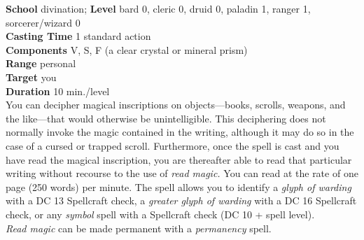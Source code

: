 \textbf{School} divination; \textbf{Level} bard 0, cleric 0, druid 0, paladin 1, ranger 1, sorcerer/wizard 0\\
\textbf{Casting Time} 1 standard action\\
\textbf{Components} V, S, F (a clear crystal or mineral prism)\\
\textbf{Range} personal\\
\textbf{Target} you\\
\textbf{Duration} 10 min./level\\
You can decipher magical inscriptions on objects---books, scrolls, weapons, and the like---that would otherwise be unintelligible. This deciphering does not normally invoke the magic contained in the writing, although it may do so in the case of a cursed or trapped scroll. Furthermore, once the spell is cast and you have read the magical inscription, you are thereafter able to read that particular writing without recourse to the use of \textit{read magic. }You can read at the rate of one page (250 words) per minute. The spell allows you to identify a \textit{glyph of warding }with a DC 13 Spellcraft check, a \textit{greater glyph of warding }with a DC 16 Spellcraft check, or any \textit{symbol }spell with a Spellcraft check (DC 10 + spell level).\\
\textit{Read magic }can be made permanent with a \textit{permanency }spell.\\

